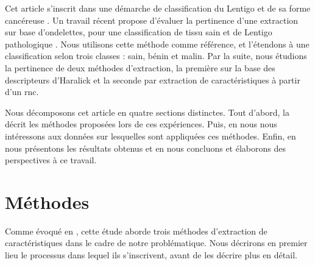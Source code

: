 \documentclass{gretsi}
\begin{document}
\begin{sloppypar}
Cet article s'inscrit dans une démarche de classification du Lentigo et de sa forme cancéreuse \cite{LeGal2011}. Un travail récent propose d'évaluer la pertinence d'une extraction sur base d'ondelettes, pour une classification de tissu sain et de Lentigo pathologique \cite{Halimi2017a}. Nous utilisons cette méthode comme référence, et l'étendons à une classification selon trois classes : sain, bénin et malin. Par la suite, nous étudions la pertinence de deux méthodes d'extraction, la première sur la base des descripteurs d'Haralick et la seconde par extraction de caractéristiques à partir d'un \ac{rnc}.\par
Nous décomposons cet article en quatre sections distinctes. Tout d'abord, la  décrit les méthodes proposées lors de ces expériences. Puis, en  nous nous intéressons aux données sur lesquelles sont appliquées ces méthodes. Enfin, en  nous présentons les résultats obtenus et en  nous concluons et élaborons des perspectives à ce travail.\par
\section{Méthodes}
\label{methode}
Comme évoqué en , cette étude aborde trois méthodes d'extraction de caractéristiques dans le cadre de notre problématique. Nous décrirons en premier lieu le processus dans lequel ils s'inscrivent, avant de les décrire plus en détail.\par

\end{sloppypar}
\end{document}
